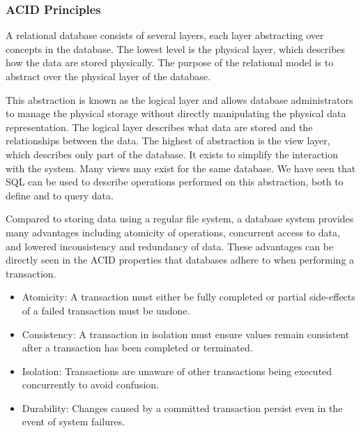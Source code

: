 \subsubsection*{ACID Principles}\label{sec:ACID}

A relational database consists of several layers, each layer abstracting over concepts in the database.
The lowest level is the physical layer, which describes how the data are stored physically.
The purpose of the relational model is to abstract over the physical layer of the database\cite{DBSBook}.

This abstraction is known as the logical layer and allows database administrators to manage the physical storage without directly manipulating the physical data representation.
The logical layer describes what data are stored and the relationships between the data\cite{DBSBook}.
The highest of abstraction is the view layer, which describes only part of the database\cite{DBSBook}.
It exists to simplify the interaction with the system. Many views may exist for the same database.
\cite{DBSBook}
We have seen that SQL can be used to describe operations performed on this abstraction, both to define and to query data.

Compared to storing data using a regular file system, a database system provides many advantages including atomicity of operations, concurrent access to data, and lowered inconsistency and redundancy of data\cite{DBSBook}.
These advantages can be directly seen in the ACID properties that databases adhere to when performing a transaction\cite{DBSBook}.
\begin{itemize} \label{ACID}
    \item Atomicity: A transaction must either be fully completed or partial side-effects of a failed transaction must be undone.
    \item Consistency: A transaction in isolation must ensure values remain consistent after a transaction has been completed or terminated.
    \item Isolation: Transactions are unaware of other transactions being executed concurrently to avoid confusion.
    \item Durability: Changes caused by a committed transaction persist even in the event of system failures.
\end{itemize}
